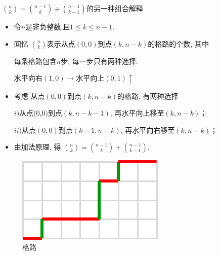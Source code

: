 \documentclass[punct]{ctexbeamer}
\begin{document}
\begin{frame}{$\binom{n}{k}=\binom{n-1}{k}+\binom{n-1}{k-1}$的另一种组合解释}

    \begin{itemize}

        \item 令$n$是非负整数,且$1\leq k\leq n-1$.

        \item 回忆 $\binom{n}{k}$表示从点$(0,0)$到点$(k,n-k)$的格路的个数, 其中

    每条格路包含$n$步, 每一步只有两种选择:
    \begin{center}
        水平向右$(1,0) \rightarrow$\quad \quad  水平向上$(0,1) \uparrow$
    \end{center}


        \item 考虑 从点$(0,0)$到点$(k,n-k)$的格路, 有两种选择

        $i)$从点(0,0)到点$(k,n-k-1)$, 再水平向上移至$(k,n-k)$；

        $ii) $从点$(0,0)$到点$(k-1,n-k)$, 再水平向右移至$(k,n-k)$；

        \item 由加法原理, 得 $\binom{n}{k}=\binom{n-1}{k}+\binom{n-1}{k-1}$.


    \end{itemize}
\begin{figure}
    \centering
    \includegraphics[scale=0.3]{path.png}
    \caption{格路}
\end{figure}
\end{frame}
\end{document}
